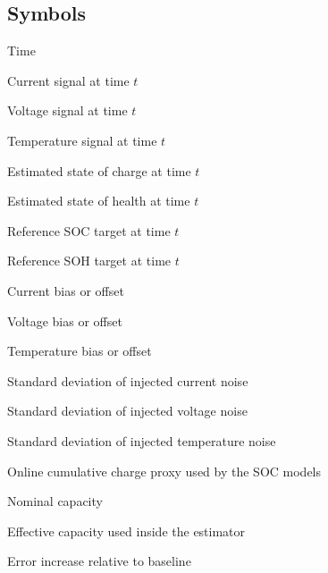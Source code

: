 \documentclass[review]{elsarticle}
\begin{document}
\subsection*{Symbols}
\begin{description}[style=multiline,leftmargin=1.7cm,font=\bfseries]
\item[$t$] Time
\item[$I(t)$] Current signal at time $t$
\item[$U(t)$] Voltage signal at time $t$
\item[$T(t)$] Temperature signal at time $t$
\item[$\widehat{\mathrm{SOC}}(t)$] Estimated state of charge at time $t$
\item[$\widehat{\mathrm{SOH}}(t)$] Estimated state of health at time $t$
\item[$\mathrm{SOC}_{\mathrm{ref}}(t)$] Reference SOC target at time $t$
\item[$\mathrm{SOH}_{\mathrm{ref}}(t)$] Reference SOH target at time $t$
\item[$\Delta I$] Current bias or offset
\item[$\Delta U$] Voltage bias or offset
\item[$\Delta T$] Temperature bias or offset
\item[$\sigma_I$] Standard deviation of injected current noise
\item[$\sigma_U$] Standard deviation of injected voltage noise
\item[$\sigma_T$] Standard deviation of injected temperature noise
\item[$Q_c$] Online cumulative charge proxy used by the SOC models
\item[$C_{\mathrm{nom}}$] Nominal capacity
\item[$C_{\mathrm{eff}}$] Effective capacity used inside the estimator
\item[$\Delta\mathrm{MAE}$] Error increase relative to baseline
\end{description}
\normalsize
\end{document}
